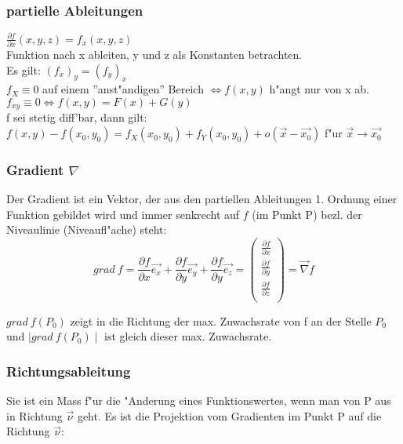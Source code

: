 \documentclass[10pt, a4paper, twocolumn]{scrartcl}
\begin{document}
\subsubsection{partielle Ableitungen}

$\frac{\partial f}{\partial x}(x,y,z)=f_x(x,y,z)$\\
Funktion nach x ableiten, y und z als Konstanten betrachten.\\
Es gilt: $(f_x)_y=(f_y)_x$\\

$f_X\equiv 0$ auf einem ''anst"andigen'' Bereich $\Leftrightarrow f(x,y)$ h"angt nur von x ab.\\

$f_{xy}\equiv 0\Leftrightarrow f(x,y)=F(x)+G(y)$\\

f sei stetig diff'bar, dann gilt: $f(x,y)-f(x_0,y_0)=f_X(x_0,y_0)+f_Y(x_0,y_0) + o(\vec{x}-\vec{x_0})$ f"ur $\vec{x}\rightarrow\vec{x_0}$

\subsubsection{Gradient $\nabla$}

Der Gradient ist ein Vektor, der aus den partiellen Ableitungen 1. Ordnung einer Funktion gebildet wird und immer senkrecht auf $f$ (im Punkt P) bezl. der Niveaulinie (Niveaufl"ache) steht:
\begin{displaymath}
 grad\:f = \frac{\partial f}{\partial x}\vec{e_x}+\frac{\partial f}{\partial y}\vec{e_y}+\frac{\partial f}{\partial y}\vec{e_z}=
\left(
 \begin{array}{c}
  \frac{\partial f}{\partial x}\\
  \frac{\partial f}{\partial y}\\
  \frac{\partial f}{\partial z}\\
 \end{array}
 \right )=\vec{\nabla}f
\end{displaymath}

$grad\:f(P_0)$ zeigt in die Richtung der max. Zuwachsrate von f an der Stelle $P_0$ und $\mid grad\: f(P_0)\mid$ ist gleich dieser max. Zuwachsrate.

\subsubsection{Richtungsableitung}

Sie ist ein Mass f"ur die "Anderung eines Funktionswertes, wenn man von P aus in Richtung $\vec{\nu}$ geht. Es ist die Projektion vom Gradienten im Punkt P auf die Richtung $\vec{\nu}$:
\end{document}
